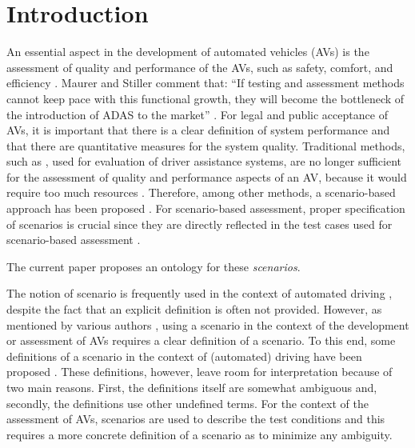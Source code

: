 \section{Introduction}
\label{sec:introduction}

An essential aspect in the development of automated vehicles (AVs) is the assessment of quality and performance of the AVs, such as safety, comfort, and efficiency \cite{bengler2014threedecades, stellet2015taxonomy, Helmer2017safety, putz2017pegasus, roesener2017comprehensive, gietelink2006development, roesener2016scenariobased, wachenfeld2016release}. 
Maurer and Stiller comment that: ``If testing and assessment methods cannot keep pace with this functional growth, they will become the bottleneck of the introduction of ADAS to the market'' \cite{bengler2014threedecades}.
For legal and public acceptance of AVs, it is important that there is a clear definition of system performance and that there are quantitative measures for the system quality. 
Traditional methods, such as \cite{response2006code, ISO26262}, used for evaluation of driver assistance systems, are no longer sufficient for the assessment of quality and performance aspects of an AV, because it would require too much resources \cite{wachenfeld2016release}. 
Therefore, among other methods, a scenario-based approach has been proposed \cite{roesener2016scenariobased, putz2017pegasus}. 
For scenario-based assessment, proper specification of scenarios is crucial since they are directly reflected in the test cases used for scenario-based assessment \cite{stellet2015taxonomy}. 

The current paper proposes an ontology for these \emph{scenarios}.

The notion of scenario is frequently used in the context of automated driving \cite{putz2017pegasus, roesener2017comprehensive, gietelink2006development, hulshof2013autonomous, karaduman2013interactivebehavior, englund2016grand, xu2002effects, ebner2011identifying, ploeg2017GCDC, zofka2015datadrivetrafficscenarios}, despite the fact that an explicit definition is often not provided. However, as mentioned by various authors \cite{stellet2015taxonomy, Helmer2017safety, alvarez2017prospective, zofka2015datadrivetrafficscenarios, aparicio2013pre, lesemann2011test, putz2017pegasus, geyer2014, ulbrich2015}, using a scenario in the context of the development or assessment of AVs requires a clear definition of a scenario. To this end, some definitions of a scenario in the context of (automated) driving have been proposed \cite{geyer2014, ulbrich2015, elrofai2016scenario}.
\cbstart
These definitions, however, leave room for interpretation because of two main reasons. First, the definitions itself are somewhat ambiguous and, secondly, the definitions use other undefined terms.
For the context of the assessment of AVs, scenarios are used to describe the test conditions \cite{stellet2015taxonomy} and this requires a more concrete definition of a scenario as to minimize any ambiguity.
\cbend


